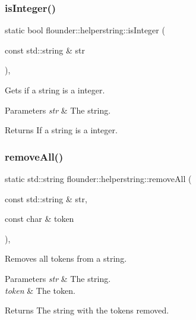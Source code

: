 \subsubsection{\texorpdfstring{is\+Integer()}{isInteger()}}
{\footnotesize\ttfamily static bool flounder\+::helperstring\+::is\+Integer (\begin{DoxyParamCaption}\item[{const std\+::string \&}]{str }\end{DoxyParamCaption})\hspace{0.3cm}{\ttfamily [inline]}, {\ttfamily [static]}}



Gets if a string is a integer. 


\begin{DoxyParams}{Parameters}
{\em str} & The string. \\
\hline
\end{DoxyParams}
\begin{DoxyReturn}{Returns}
If a string is a integer. 
\end{DoxyReturn}
\mbox{\label{classflounder_1_1helperstring_a8e9dfff09ae9a525b553dffa6c1113ff}} 
\subsubsection{\texorpdfstring{remove\+All()}{removeAll()}}
{\footnotesize\ttfamily static std\+::string flounder\+::helperstring\+::remove\+All (\begin{DoxyParamCaption}\item[{const std\+::string \&}]{str,  }\item[{const char \&}]{token }\end{DoxyParamCaption})\hspace{0.3cm}{\ttfamily [inline]}, {\ttfamily [static]}}



Removes all tokens from a string. 


\begin{DoxyParams}{Parameters}
{\em str} & The string. \\
\hline
{\em token} & The token. \\
\hline
\end{DoxyParams}
\begin{DoxyReturn}{Returns}
The string with the tokens removed. 
\end{DoxyReturn}
\mbox{\label{classflounder_1_1helperstring_a103cbd1a0307302480f77ae7214f830c}} 
